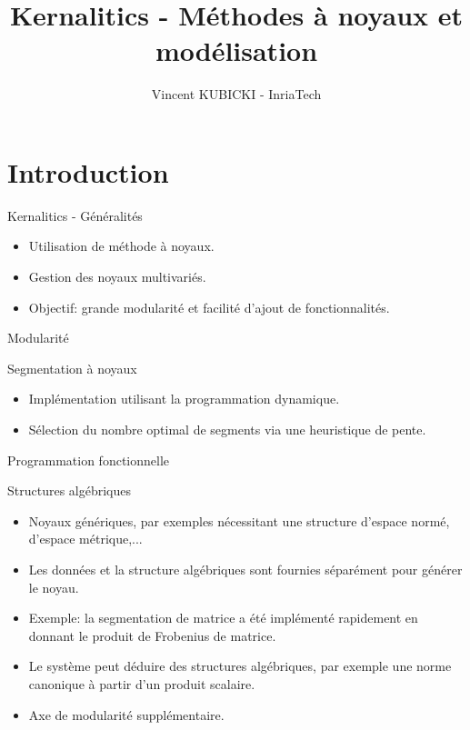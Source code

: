 \documentclass{beamer}
\title[Kernalitics]{Kernalitics - Méthodes à noyaux et modélisation}
\author[VK]{Vincent KUBICKI - InriaTech}
\institute[Inria]{Inria Lille - Nord Europe}
\begin{document}
\begin{frame}[plain]
	\titlepage
\end{frame}

\section{Introduction}

\begin{frame}{Kernalitics - Généralités}
	\begin{itemize}
		\item Utilisation de méthode à noyaux.
		\item Gestion des noyaux multivariés.
		\item Objectif: grande modularité et facilité d'ajout de fonctionnalités.
	\end{itemize}
\end{frame}

\begin{frame}{Modularité}
\end{frame}

\begin{frame}{Segmentation à noyaux}
	\begin{itemize}
		\item Implémentation utilisant la programmation dynamique.
		\item Sélection du nombre optimal de segments via une heuristique de pente.
	\end{itemize}
\end{frame}
\begin{frame}{Programmation fonctionnelle}
\end{frame}

\begin{frame}{Structures algébriques}
	\begin{itemize}
		\item Noyaux génériques, par exemples nécessitant une structure d'espace normé, d'espace métrique,...
		\item Les données et la structure algébriques sont fournies séparément pour générer le noyau.
		\item Exemple: la segmentation de matrice a été implémenté rapidement en donnant le produit de Frobenius de matrice.
		\item Le système peut déduire des structures algébriques, par exemple une norme canonique à partir d'un produit scalaire.
		\item Axe de modularité supplémentaire.
	\end{itemize}

\end{frame}
\end{document}
